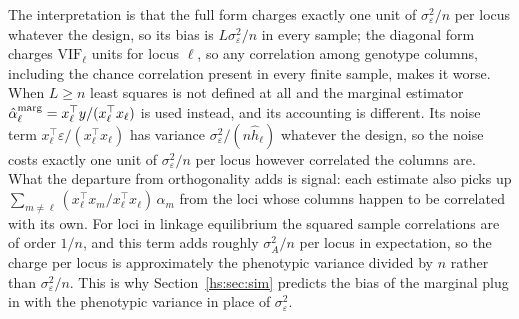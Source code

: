 The interpretation is that the full form charges exactly one unit of $\sigma^2_\varepsilon/n$ per locus whatever the design, so its bias is $L\sigma^2_\varepsilon/n$ in every sample; the diagonal form charges $\mathrm{VIF}_\ell$ units for locus $\ell$, so any correlation among genotype columns, including the chance correlation present in every finite sample, makes it worse. When $L \ge n$ least squares is not defined at all and the marginal estimator $\hat\alpha^{\rm marg}_\ell = x_\ell^\top y/(x_\ell^\top x_\ell)$ is used instead, and its accounting is different. Its noise term $x_\ell^\top\varepsilon/(x_\ell^\top x_\ell)$ has variance $\sigma^2_\varepsilon/(n\hat h_\ell)$ whatever the design, so the noise costs exactly one unit of $\sigma^2_\varepsilon/n$ per locus however correlated the columns are. What the departure from orthogonality adds is signal: each estimate also picks up $\sum_{m\ne\ell}(x_\ell^\top x_m/x_\ell^\top x_\ell)\,\alpha_m$ from the loci whose columns happen to be correlated with its own. For loci in linkage equilibrium the squared sample correlations are of order $1/n$, and this term adds roughly $\sigma^2_A/n$ per locus in expectation, so the charge per locus is approximately the phenotypic variance divided by $n$ rather than $\sigma^2_\varepsilon/n$. This is why Section~\ref{hs:sec:sim} predicts the bias of the marginal plug in with the phenotypic variance in place of $\sigma^2_\varepsilon$.

